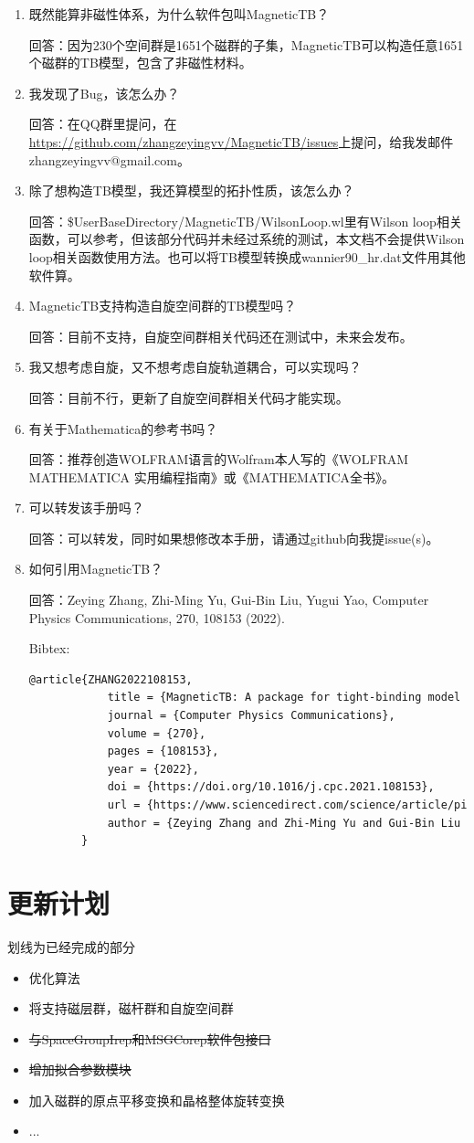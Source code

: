 \documentclass[titlepage,a4paper,12pt,AutoFakeBold]{article}
\newcommand\litem[1]{\item{ #1？\\}}
\begin{document}
\begin{enumerate}[style=nextline]
	\litem{既然能算非磁性体系，为什么软件包叫\textsf{MagneticTB}}
	
	回答：因为230个空间群是1651个磁群的子集，\textsf{MagneticTB}可以构造任意1651个磁群的TB模型，包含了非磁性材料。
	

	
	\litem{我发现了Bug，该怎么办}
	
	回答：在QQ群里提问，在\url{https://github.com/zhangzeyingvv/MagneticTB/issues}上提问，给我发邮件zhangzeyingvv@gmail.com。
	
	\litem{除了想构造TB模型，我还算模型的拓扑性质，该怎么办}
	
	回答：\$UserBaseDirectory/MagneticTB/WilsonLoop.wl里有Wilson loop相关函数，可以参考，但该部分代码并未经过系统的测试，本文档不会提供Wilson loop相关函数使用方法。也可以将TB模型转换成wannier90\_hr.dat文件用其他软件算。
	
	
	\litem{\textsf{MagneticTB}支持构造自旋空间群的TB模型吗}

	回答：目前不支持，自旋空间群相关代码还在测试中，未来会发布。

	\litem{我又想考虑自旋，又不想考虑自旋轨道耦合，可以实现吗}
	
	回答：目前不行，更新了自旋空间群相关代码才能实现。

	\litem{有关于Mathematica的参考书吗}
	
	回答：推荐创造WOLFRAM语言的Wolfram本人写的《WOLFRAM  MATHEMATICA 实用编程指南》或《MATHEMATICA全书》。	
		
	\litem{可以转发该手册吗}

	回答：可以转发，同时如果想修改本手册，请通过github向我提issue(s)。

	\litem{如何引用\textsf{MagneticTB}}

    回答：Zeying Zhang, Zhi-Ming Yu, Gui-Bin Liu, Yugui Yao,
    Computer Physics Communications,
    270,
    108153 (2022).
    
    Bibtex:
    \begin{lstlisting}[numbers=none,language=TeX]
    	@article{ZHANG2022108153,
    		title = {MagneticTB: A package for tight-binding model of magnetic and non-magnetic materials},
    		journal = {Computer Physics Communications},
    		volume = {270},
    		pages = {108153},
    		year = {2022},
    		doi = {https://doi.org/10.1016/j.cpc.2021.108153},
    		url = {https://www.sciencedirect.com/science/article/pii/S0010465521002654},
    		author = {Zeying Zhang and Zhi-Ming Yu and Gui-Bin Liu and Yugui Yao}
    	}
    \end{lstlisting}
\end{enumerate}

\section{更新计划}
划线为已经完成的部分
\begin{itemize}
	\item	优化算法
	\item	将支持磁层群，磁杆群和自旋空间群
	\item	\sout{与\textsf{SpaceGroupIrep}和\textsf{MSGCorep}软件包接口}
	\item	\sout{增加拟合参数模块}
	\item	加入磁群的原点平移变换和晶格整体旋转变换
	\item	...
\end{itemize}
\end{document}
